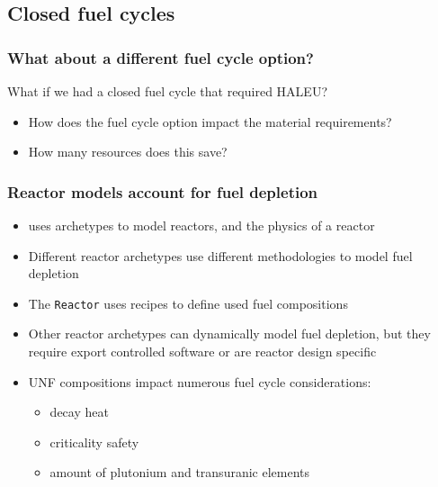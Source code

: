 \subsection{Closed fuel cycles}
\begin{frame}
    \frametitle{What about a different fuel cycle option?}
    What if we had a closed fuel cycle that required \gls{HALEU}?
    \begin{itemize}
        \item How does the fuel cycle option impact the material requirements?
        \item How many resources does this save?
    \end{itemize}

\end{frame}

\begin{frame}
    \frametitle{Reactor models account for fuel depletion}
    \begin{itemize}
    \item \Cyclus uses archetypes to model reactors, and the physics 
        of a reactor
    \item Different reactor archetypes use different methodologies 
        to model fuel depletion
   \item<2-> The \Cycamore \texttt{Reactor} uses recipes to define used fuel compositions
   \item<2-> Other \Cyclus reactor archetypes can dynamically model 
         fuel depletion, but they require export controlled software 
         or are reactor design specific
    \item<3-> \Gls{UNF} compositions impact numerous fuel cycle considerations:
    \begin{itemize}
        \item<3-> decay heat
        \item<3-> criticality safety
        \item<3-> amount of plutonium and transuranic elements
    \end{itemize}


\end{itemize}
\end{frame}

